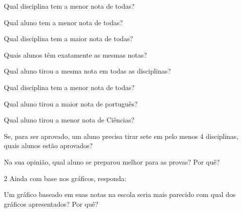 \pagebreak
\begin{escolha}[itemsep=-5pt]
\item Qual disciplina tem a menor nota de todas?


\item Qual aluno tem a menor nota de todas?


\item Qual disciplina tem a maior nota de todas?


\item Quais alunos têm exatamente as mesmas notas?


\item Qual aluno tirou a mesma nota em todas as disciplinas?


\item Qual disciplina tem a menor nota de todas?


\item Qual aluno tirou a maior nota de português?


\item Qual aluno tirou a menor nota de Ciências?


\item Se, para ser aprovado, um aluno precisa tirar sete em pelo menos 4 disciplinas, quais alunos estão aprovados?


\item Na sua opinião, qual aluno se preparou melhor para as provas? Por quê?

\reduline{\mbox{}\hfill}
\reduline{\mbox{}\hfill}
\reduline{\mbox{}\hfill}
\end{escolha}

\num{2} Ainda com base nos gráficos, responda:

Um gráfico baseado em suas notas na escola seria mais parecido com qual dos gráficos apresentados? Por quê?

